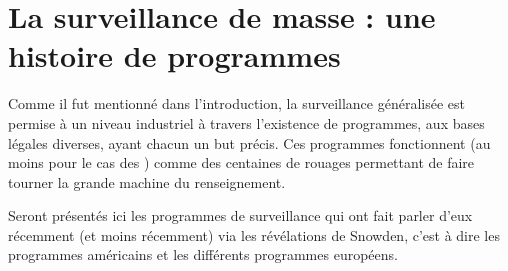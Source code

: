 
\chapter{La surveillance de masse : une histoire de programmes}
\label{ch:programmes}


Comme il fut mentionné dans l'introduction, la surveillance généralisée est
permise à un niveau industriel à travers l'existence de programmes, aux bases
légales diverses, ayant chacun un but précis. Ces programmes fonctionnent (au
moins pour le cas des \EUA) comme des centaines de rouages permettant de faire
tourner la grande machine du renseignement.\newline

Seront présentés ici les programmes de surveillance qui ont fait parler d'eux
récemment (et moins récemment) via les révélations de Snowden, c'est à dire les
programmes américains et les différents programmes européens.



\newpage

\newpage

\newpage





